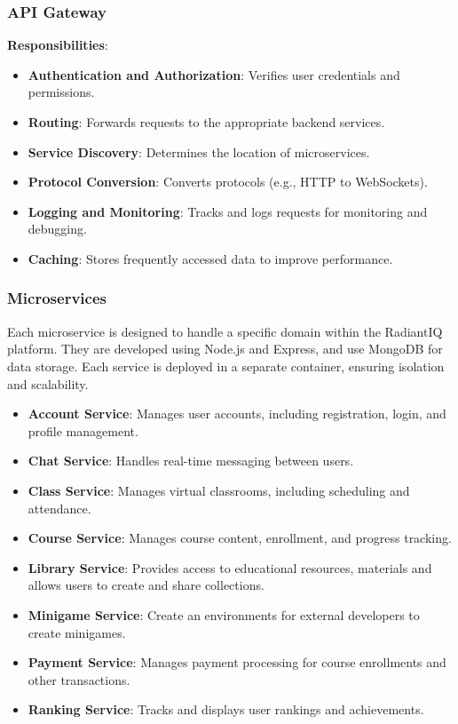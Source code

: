 \subsubsection{API Gateway}
\textbf{Responsibilities}:
\begin{itemize}
    \item \textbf{Authentication and Authorization}: Verifies user credentials and permissions.
    \item \textbf{Routing}: Forwards requests to the appropriate backend services.
    \item \textbf{Service Discovery}: Determines the location of microservices.
    \item \textbf{Protocol Conversion}: Converts protocols (e.g., HTTP to WebSockets).
    \item \textbf{Logging and Monitoring}: Tracks and logs requests for monitoring and debugging.
    \item \textbf{Caching}: Stores frequently accessed data to improve performance.
\end{itemize}

\subsubsection{Microservices}
Each microservice is designed to handle a specific domain within the RadiantIQ platform. They are developed using Node.js and Express, and use MongoDB for data storage. Each service is deployed in a separate container, ensuring isolation and scalability.

\begin{itemize}
    \item \textbf{Account Service}: Manages user accounts, including registration, login, and profile management.
    \item \textbf{Chat Service}: Handles real-time messaging between users.
    \item \textbf{Class Service}: Manages virtual classrooms, including scheduling and attendance.
    \item \textbf{Course Service}: Manages course content, enrollment, and progress tracking.
    \item \textbf{Library Service}: Provides access to educational resources, materials and allows users to create and share collections.
    \item \textbf{Minigame Service}: Create an environments for external developers to create minigames.
    \item \textbf{Payment Service}: Manages payment processing for course enrollments and other transactions.
    \item \textbf{Ranking Service}: Tracks and displays user rankings and achievements.
\end{itemize}

